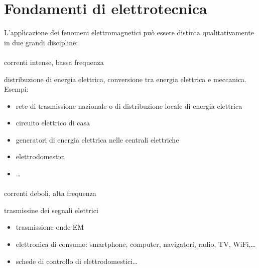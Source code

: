 \documentclass[letterpaper,10pt,italian]{jupyterBook}
\begin{document}
\sphinxstepscope


\chapter{Fondamenti di elettrotecnica}
\label{\detokenize{ch/electromagnetism/electrical-engineering:fondamenti-di-elettrotecnica}}\label{\detokenize{ch/electromagnetism/electrical-engineering:physics-hs-electromagnetism-electric-engineering}}\label{\detokenize{ch/electromagnetism/electrical-engineering::doc}}
\sphinxAtStartPar
L’applicazione dei fenomeni elettromagnetici può essere distinta qualitativamente in due grandi discipline:
\subsubsection*{}

\sphinxAtStartPar
{} correnti intense, bassa frequenza

\sphinxAtStartPar
{} distribuzione di energia elettrica, conversione tra energia elettrica e meccanica. Esempi:
\begin{itemize}
\item {} 
\sphinxAtStartPar
rete di trasmissione nazionale o di distribuzione locale di energia elettrica

\item {} 
\sphinxAtStartPar
circuito elettrico di casa

\item {} 
\sphinxAtStartPar
generatori di energia elettrica nelle centrali elettriche

\item {} 
\sphinxAtStartPar
elettrodomestici

\item {} 
\sphinxAtStartPar
…

\end{itemize}
\subsubsection*{}

\sphinxAtStartPar
{} correnti deboli, alta frequenza

\sphinxAtStartPar
{} trasmissine dei segnali elettrici
\begin{itemize}
\item {} 
\sphinxAtStartPar
trasmissione onde EM

\item {} 
\sphinxAtStartPar
elettronica di consumo: smartphone, computer, navigatori, radio, TV, Wi\sphinxhyphen{}Fi,…

\item {} 
\sphinxAtStartPar
schede di controllo di elettrodomestici…

\end{itemize}
\end{document}
